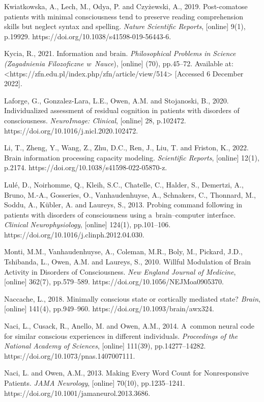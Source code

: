 Kwiatkowska, A., Lech, M., Odya, P. and Czyżewski, A., 2019. Post-comatose patients with minimal consciousness tend to preserve reading comprehension skills but neglect syntax and spelling. \textit{Nature Scientific Reports}, [online] 9(1), p.19929. https://doi.org/10.1038/s41598-019-56443-6.

Kycia, R., 2021. Information and brain. \textit{Philosophical Problems in Science (Zagadnienia Filozoficzne w~Nauce}), [online] (70), pp.45–72. Available at: {\textless}https://zfn.edu.pl/index.php/zfn/article/view/514{\textgreater} [Accessed 6 December 2022].

Laforge, G., Gonzalez-Lara, L.E., Owen, A.M. and Stojanoski, B., 2020. Individualized assessment of residual cognition in patients with disorders of consciousness. \textit{NeuroImage: Clinical}, [online] 28, p.102472. https://doi.org/10.1016/j.nicl.2020.102472.

Li, T., Zheng, Y., Wang, Z., Zhu, D.C., Ren, J., Liu, T. and Friston, K., 2022. Brain information processing capacity modeling. \textit{Scientific Reports}, [online] 12(1), p.2174. https://doi.org/10.1038/s41598-022-05870-z.

Lulé, D., Noirhomme, Q., Kleih, S.C., Chatelle, C., Halder, S., Demertzi, A., Bruno, M.-A., Gosseries, O., Vanhaudenhuyse, A., Schnakers, C., Thonnard, M., Soddu, A., Kübler, A. and Laureys, S., 2013. Probing command following in patients with disorders of consciousness using a~brain–computer interface. \textit{Clinical Neurophysiology}, [online] 124(1), pp.101–106. https://doi.org/10.1016/j.clinph.2012.04.030.

Monti, M.M., Vanhaudenhuyse, A., Coleman, M.R., Boly, M., Pickard, J.D., Tshibanda, L., Owen, A.M. and Laureys, S., 2010. Willful Modulation of Brain Activity in Disorders of Consciousness. \textit{New England Journal of Medicine}, [online] 362(7), pp.579–589. https://doi.org/10.1056/NEJMoa0905370.

Naccache, L., 2018. Minimally conscious state or cortically mediated state? \textit{Brain}, [online] 141(4), pp.949–960. https://doi.org/10.1093/brain/awx324.

Naci, L., Cusack, R., Anello, M. and Owen, A.M., 2014. A~common neural code for similar conscious experiences in different individuals. \textit{Proceedings of the National Academy of Sciences}, [online] 111(39), pp.14277–14282. https://doi.org/10.1073/pnas.1407007111.

Naci, L. and Owen, A.M., 2013. Making Every Word Count for Nonresponsive Patients. \textit{JAMA Neurology}, [online] 70(10), pp.1235–1241. https://doi.org/10.1001/jamaneurol.2013.3686.

